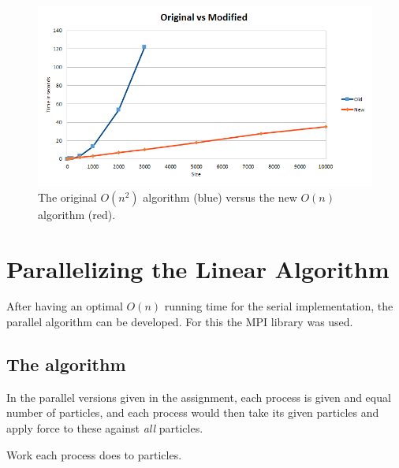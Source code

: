 \documentclass[a4paper,11pt,oneside]{book}
\begin{document}
\begin{figure}[H]
  \centering
  \begin{minipage}[b]{0.9\textwidth}
    \includegraphics[width=\textwidth]{graph_regular.png}
    \caption{The original $O(n^{2})$ algorithm (blue) versus the new $O(n)$ algorithm (red).}
  \end{minipage}
\end{figure}

\chapter{Parallelizing the Linear Algorithm}

After having an optimal $O(n)$ running time for the serial implementation, the parallel algorithm can be developed. For
this the MPI library was used.

\section{The algorithm}

In the parallel versions given in the assignment, each process is given and equal number of particles, and each process
would then take its given particles and apply force to these against \emph{all} particles.

\IncMargin{1em}
\begin{algorithm}
\BlankLine
{}
\caption{Work each process does to particles.}\label{algo_disjdecomp}
\end{algorithm}\DecMargin{1em}
\end{document}
